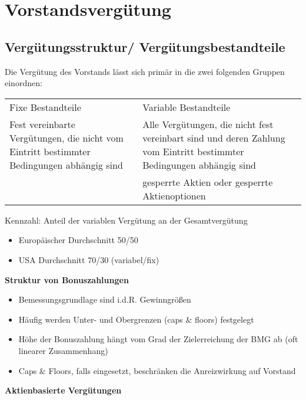 \documentclass[
]{article}
\providecommand{\tightlist}{%
  \setlength{\itemsep}{0pt}\setlength{\parskip}{0pt}}
\begin{document}
\hypertarget{vorstandsverguxfctung}{%
\section{Vorstandsvergütung}\label{vorstandsverguxfctung}}

\hypertarget{verguxfctungsstruktur-verguxfctungsbestandteile}{%
\subsection{Vergütungsstruktur/
Vergütungsbestandteile}\label{verguxfctungsstruktur-verguxfctungsbestandteile}}

Die Vergütung des Vorstands lässt sich primär in die zwei folgenden
Gruppen einordnen:

\begin{longtable}[]{@{}ll@{}}
\toprule
\endhead
Fixe Bestandteile & Variable Bestandteile \\
Fest vereinbarte Vergütungen, die nicht vom Eintritt bestimmter
Bedingungen abhängig sind & Alle Vergütungen, die nicht fest vereinbart
sind und deren Zahlung vom Eintritt bestimmter Bedingungen abhängig
sind \\
& gesperrte Aktien oder gesperrte Aktienoptionen \\
\bottomrule
\end{longtable}

Kennzahl: Anteil der variablen Vergütung an der Gesamtvergütung

\begin{itemize}
\tightlist
\item
  Europäischer Durchschnitt 50/50
\item
  USA Durchschnitt 70/30 (variabel/fix)
\end{itemize}

\textbf{Struktur von Bonuszahlungen}

\begin{itemize}
\tightlist
\item
  Bemessungsgrundlage sind i.d.R. Gewinngrößen
\item
  Häufig werden Unter- und Obergrenzen (caps \& floors) festgelegt
\item
  Höhe der Bonuszahlung hängt vom Grad der Zielerreichung der BMG ab
  (oft linearer Zusammenhang)
\item
  Caps \& Floors, falls eingesetzt, beschränken die Anreizwirkung auf
  Vorstand
\end{itemize}

\textbf{Aktienbasierte Vergütungen}
\end{document}
